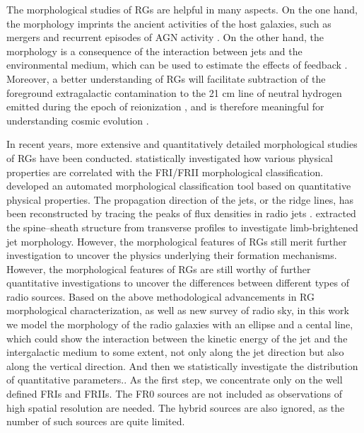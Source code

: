 \documentclass{aa}
\begin{document}
The morphological studies of RGs are helpful in many aspects. 
On the one hand, the morphology imprints the ancient activities of the host galaxies, such as mergers and recurrent episodes of AGN activity \citep[e.g.,][]{merritt_tracing_2002,liu_x-shaped_2004,hardcastle_ngc_2019,lara_restarting_1999,saikia_recurrent_2009,kuzmicz_optical_2017}. On the other hand, the morphology is a consequence of the interaction between jets and the environmental medium, which can be used to estimate the effects of feedback \citep{begelman_theory_1984,blandford_relativistic_2019}. Moreover, a better understanding of RGs will facilitate subtraction of the foreground extragalactic contamination to the 21 cm line of neutral hydrogen emitted during the epoch of reionization \citep{di_matteo_radio_2002,di_matteo_21-cm_2004}, and is therefore meaningful for understanding cosmic evolution \citep{madau_21_1997,tozzi_radio_2000,furlanetto_cosmology_2006}.

In recent years, more extensive and quantitatively detailed morphological studies of RGs have been conducted. 
\cite{lin_populations_2010} statistically investigated how various physical properties are correlated with the FRI/FRII morphological classification. \cite{mingo_revisiting_2019} developed an automated morphological classification tool based on quantitative physical properties. 
The propagation direction of the jets, or the ridge lines, has been reconstructed by tracing the peaks of flux densities in radio jets \citep[e.g.,][]{barkus_application_2021,velovic_collimation_2022,clews_radio-loud_2025}. \cite{park_discovery_2024,foschi_evolution_2025} extracted the spine--sheath structure from transverse profiles to investigate limb-brightened jet morphology. However, the morphological features of RGs still merit further investigation to uncover the physics underlying their formation mechanisms.
However, the morphological features of RGs are still worthy of  further quantitative investigations to uncover the differences between different types of radio sources.
Based on the above methodological advancements in RG morphological characterization, as well as new survey of radio sky, in this work we  model the morphology of the radio galaxies with an ellipse and a cental line,  which could show the interaction between the kinetic energy of the jet and the intergalactic medium to some extent, not only along the jet direction but also along the  vertical direction. And then we statistically investigate the distribution of quantitative parameters..
As the first step, we concentrate only on the well defined FRIs and FRIIs. 
The FR0 sources are not included as observations of high spatial resolution are needed. The hybrid sources are also ignored, as the number of such sources are quite limited. 
\end{document}
